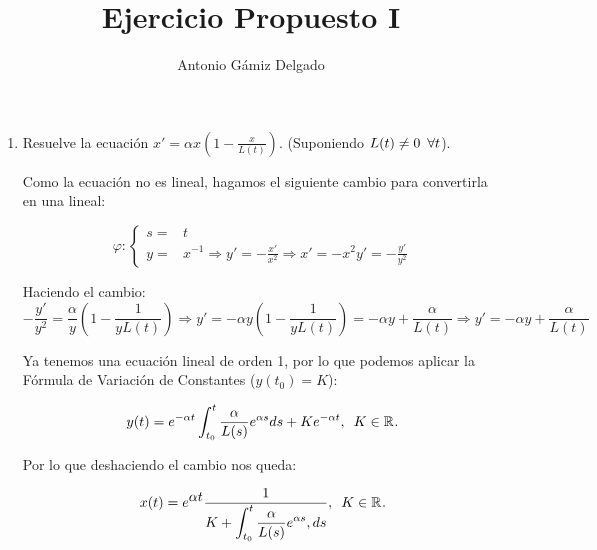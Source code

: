 \documentclass[12pt]{article}
\newcommand{\R}[1][]{\mathbb{R}^{#1}}
\begin{document}

\author{Antonio Gámiz Delgado}
\title{Ejercicio Propuesto I}
\maketitle

\begin{enumerate}
\item Resuelve la ecuación $\displaystyle x'=\alpha x\left(1-\frac{x}{L(t)}\right)$. (Suponiendo $L(t)\neq 0 \enskip \forall t$).

Como la ecuación no es lineal, hagamos el siguiente cambio para convertirla en una lineal:

\[
\varphi : \left \{ 
\begin{array}{ll}
s =& t \\
y =& x^{-1} \Longrightarrow y'=\displaystyle-\frac{x'}{x^2} \Longrightarrow x'=-x^2y'=-\frac{y'}{y^2}
\end{array}
\right.
\]

Haciendo el cambio:
\[
-\frac{y'}{y^2}=\frac{\alpha}{y}\left( 1- \frac{1}{yL(t)} \right) \Longrightarrow y'=-\alpha y\left( 1- \frac{1}{yL(t)} \right)=-\alpha y + \frac{\alpha}{L(t)} \Longrightarrow y'=-\alpha y + \frac{\alpha}{L(t)}
\]

Ya tenemos una ecuación lineal de orden 1, por lo que podemos aplicar la Fórmula de Variación de Constantes ($y(t_0)=K$):

\[
y(t)=e^{-\alpha t}\int_{t_0}^t \frac{\alpha}{L(s)} e^{\alpha s}ds+Ke^{-\alpha t}, \enskip K\in\R.
\]

Por lo que deshaciendo el cambio nos queda:

\[
x(t) = e^{\displaystyle\alpha t}\frac{1}{K+\displaystyle\int_{t_0}^t\frac{\alpha}{L(s)} e^{\alpha s}, ds}, \enskip K\in\R.
\]

\end{enumerate}
\end{document}

